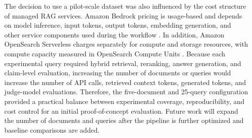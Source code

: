 
The decision to use a pilot-scale dataset was also influenced by the cost structure of managed RAG services. Amazon Bedrock pricing is usage-based and depends on model inference, input tokens, output tokens, embedding generation, and other service components used during the workflow \cite{awsbedrockpricing}. In addition, Amazon OpenSearch Serverless charges separately for compute and storage resources, with compute capacity measured in OpenSearch Compute Units \cite{opensearchpricing}. Because each experimental query required hybrid retrieval, reranking, answer generation, and claim-level evaluation, increasing the number of documents or queries would increase the number of API calls, retrieved context tokens, generated tokens, and judge-model evaluations. Therefore, the five-document and 25-query configuration provided a practical balance between experimental coverage, reproducibility, and cost control for an initial proof-of-concept evaluation. Future work will expand the number of documents and queries after the pipeline is further optimized and baseline comparisons are added.
